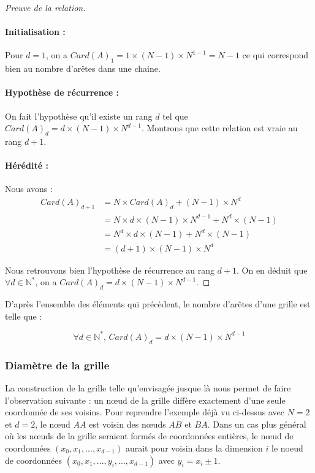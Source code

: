 \begin{proof}[Preuve de la relation]
\item
\paragraph{Initialisation :} 
Pour $d=1$, on a $Card(A)_1 = 1\times (N-1)\times N^{1-1} = N-1$ ce qui correspond bien au nombre d'arêtes dans une chaine.

\paragraph{Hypothèse de récurrence :}
On fait l'hypothèse qu'il existe un rang $d$ tel que $Card(A)_d = d\times (N-1)\times N^{d-1}$. Montrons que cette relation est vraie au rang $d+1$.

\paragraph{Hérédité :} Nous avons :
\begin{align*}
Card(A)_{d+1} & = N \times Card(A)_d + (N-1)\times N^d \\
& = N\times d\times (N-1)\times N^{d-1} + N^d\times (N-1)\\
& = N^d\times d\times (N-1) + N^d\times (N-1)\\
& = (d+1)\times (N-1)\times N^d
\end{align*}

Nous retrouvons bien l'hypothèse de récurrence au rang $d+1$. On en déduit que $\forall d \in \mathbb{N^*}$, on a $Card(A)_d = d\times (N-1)\times N^{d-1}$.
\end{proof}

D'après l'ensemble des éléments qui précèdent, le nombre d'arêtes d'une grille est telle que :

$$\forall d \in \mathbb{N^*} \text{, }Card(A)_d = d\times (N-1)\times N^{d-1} $$ 


\subsubsection*{Diamètre de la grille}

La construction de la grille telle qu'envisagée jusque là nous permet de faire l'observation suivante : un nœud de la grille diffère exactement d'une seule coordonnée de ses voisins. Pour reprendre l'exemple déjà vu ci-dessus avec $N=2$ et $d=2$, le nœud $AA$ est voisin des nœuds $AB$ et $BA$. Dans un cas plus général où les nœuds de la grille seraient formés de coordonnées entières, le nœud de coordonnées $(x_0,x_1, ..., x_{d-1})$ aurait pour voisin dans la dimension $i$ le noeud de coordonnées $(x_0,x_1,...,y_i,...,x_{d-1})$ avec $y_i=x_i\pm1$.

